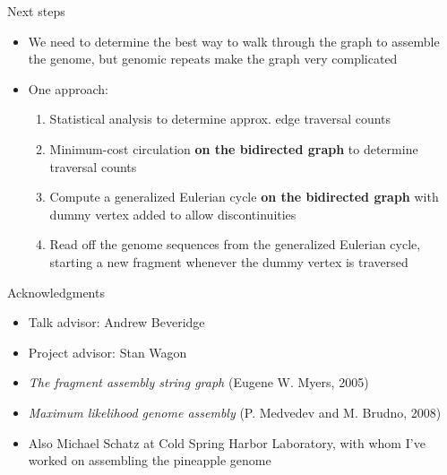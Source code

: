 \documentclass[xcolor=dvipsnames]{beamer}
\begin{document}
\begin{frame}{Next steps}
    \begin{itemize}
        \item We need to determine the best way to walk through the graph to
            assemble the genome, but genomic repeats make the graph very
            complicated
        \item One approach:
            \begin{enumerate}
                \item Statistical analysis to determine approx. edge traversal counts
                \item Minimum-cost circulation {\bf on the bidirected graph} to
                      determine traversal counts
                \item Compute a generalized Eulerian cycle {\bf on the bidirected graph}
                      with dummy vertex added to allow discontinuities
                \item Read off the genome sequences from the generalized Eulerian cycle,
                      starting a new fragment whenever the dummy vertex is traversed
            \end{enumerate}
    \end{itemize}
\end{frame}

\begin{frame}{Acknowledgments}
    \begin{itemize}
        \item Talk advisor: Andrew Beveridge
        \item Project advisor: Stan Wagon
        \item {\em The fragment assembly string graph} (Eugene W. Myers, 2005)
        \item {\em Maximum likelihood genome assembly} (P. Medvedev  and M. Brudno, 2008)
        \item Also Michael Schatz at Cold Spring Harbor Laboratory, with whom
              I've worked on assembling the pineapple genome
    \end{itemize}
\end{frame}
\end{document}
